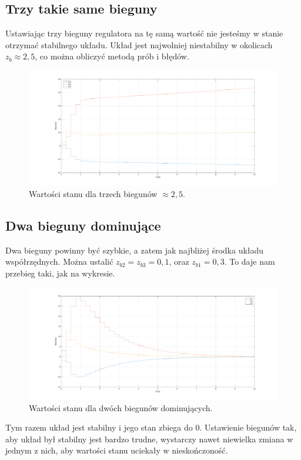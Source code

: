 \subsection{Trzy takie same bieguny}
Ustawiając trzy bieguny regulatora na tę samą wartość nie jesteśmy w stanie otrzymać stabilnego układu.
Układ jest najwolniej niestabilny w okolicach $z_b \approx 2,5$, co można obliczyć metodą prób i błędów.

\begin{figure}[H]
\centering
 \includegraphics[width=\textwidth]{img/plot5_1.pdf}
\caption{Wartości stanu dla trzech biegunów $\approx 2,5$.}
\end{figure}

\subsection{Dwa bieguny dominujące}
Dwa bieguny powinny być szybkie, a zatem jak najbliżej środka układu współrzędnych.
Można ustalić $z_{b2} = z_{b3} = 0,1$, oraz $z_{b1} = 0,3$.
To daje nam przebieg taki, jak na wykresie.
\begin{figure}[H]
\centering
 \includegraphics[width=\textwidth]{img/plot5_2.pdf}
\caption{Wartości stanu dla dwóch biegunów dominujących.}
\end{figure}
Tym razem układ jest stabilny i jego stan zbiega do 0.
Ustawienie biegunów tak, aby układ był stabilny jest bardzo trudne, wystarczy nawet niewielka zmiana w jednym z nich, aby wartości stanu uciekały w nieskończoność.

